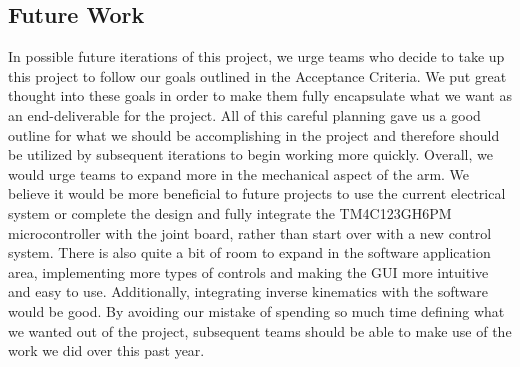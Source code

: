 \subsection{Future Work}
\noindent In possible future iterations of this project, we urge teams who decide to take up this project to follow our goals outlined in the Acceptance Criteria. We put great thought into these goals in order to make them fully encapsulate what we want as an end-deliverable for the project.  All of this careful planning gave us a good outline for what we should be accomplishing in the project and therefore should be utilized by subsequent iterations to begin working more quickly. Overall, we would urge teams to expand more in the mechanical aspect of the arm. We believe it would be more beneficial to future projects to use the current electrical system or complete the design and fully integrate the TM4C123GH6PM microcontroller with the joint board, rather than start over with a new control system. There is also quite a bit of room to expand in the software application area, implementing more types of controls and making the GUI more intuitive and easy to use. Additionally, integrating inverse kinematics with the software would be good. By avoiding our mistake of spending so much time defining what we wanted out of the project, subsequent teams should be able to make use of the work we did over this past year.

